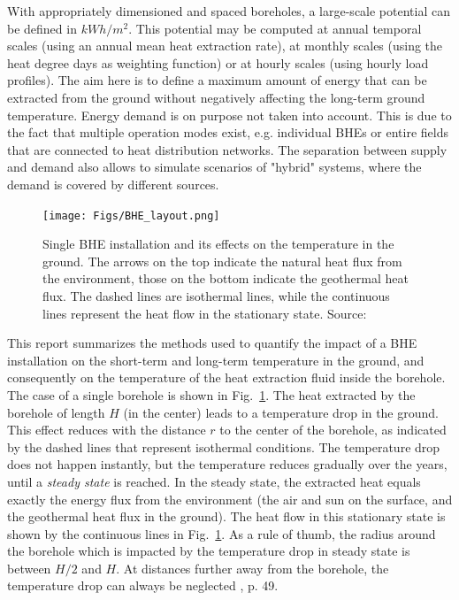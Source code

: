 With appropriately dimensioned and spaced boreholes, a large-scale potential can be defined in $kWh/m^2$. This potential may be computed at annual temporal scales (using an annual mean heat extraction rate), at monthly scales (using the heat degree days as weighting function) or at hourly scales (using hourly load profiles).
The aim here is to define a maximum amount of energy that can be extracted from the ground without negatively affecting the long-term ground temperature. Energy demand is on purpose not taken into account. 
This is due to the fact that multiple operation modes exist, e.g. individual BHEs or entire fields that are connected to heat distribution networks. The separation between supply and demand also allows to simulate scenarios of "hybrid" systems, where the demand is covered by different sources.

\begin{figure}
    \centering
    \texttt{[image: Figs/BHE\_layout.png]}
    \caption[Single BHE installation and its effects on the temperature in the ground.]{Single BHE installation and its effects on the temperature in the ground. The arrows on the top indicate the natural heat flux from the environment, those on the bottom indicate the geothermal heat flux. The dashed lines are isothermal lines, while the continuous lines represent the heat flow in the stationary state. Source: \citet{wagner_erdsondenpotenzial_2014}}
    \label{fig:BHE}
\end{figure}

This report summarizes the methods used to quantify the impact of a BHE installation on the short-term and long-term temperature in the ground, and consequently on the temperature of the heat extraction fluid inside the borehole. The case of a single borehole is shown in Fig.~\ref{fig:BHE}. The heat extracted by the borehole of length $H$ (in the center) leads to a temperature drop in the ground. This effect reduces with the distance $r$ to the center of the borehole, as indicated by the dashed lines that represent isothermal conditions. The temperature drop does not happen instantly, but the temperature reduces gradually over the years, until a \textit{steady state} is reached. In the steady state, the extracted heat equals exactly the energy flux from the environment (the air and sun on the surface, and the geothermal heat flux in the ground). The heat flow in this stationary state is shown by the continuous lines in Fig.~\ref{fig:BHE}. As a rule of thumb, the radius around the borehole which is impacted by the temperature drop in steady state is between $H/2$ and $H$. At distances further away from the borehole, the temperature drop can always be neglected \cite{pahud_geothermal_2002}, p. 49.

